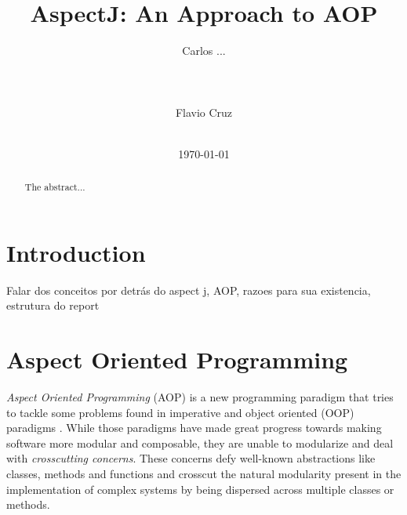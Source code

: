 \documentclass{template}
\begin{document}
\title{AspectJ: An Approach to AOP}


\author{
\alignauthor
Carlos ...\\
       \\
       \\
       \\
\alignauthor
Flavio Cruz\\
       \\
}
\date{\today}

\maketitle
\begin{abstract}
The abstract...
\end{abstract}


\section{Introduction}
Falar dos conceitos por detrás do aspect j, AOP, razoes para sua existencia, estrutura do report

\section{Aspect Oriented Programming}

\emph{Aspect Oriented Programming} (AOP) is a new programming paradigm that tries to tackle some problems
found in imperative and object oriented (OOP) paradigms \cite{Kiczales97aspect-orientedprogramming}. While those paradigms have made great progress towards
making software more modular and composable, they are unable to modularize and deal with \emph{crosscutting concerns}.
These concerns defy well-known abstractions like classes, methods and functions and crosscut the
natural modularity present in the implementation of complex systems by being dispersed
across multiple classes or methods. \cite{Kiczales01anoverview}
\end{document}

